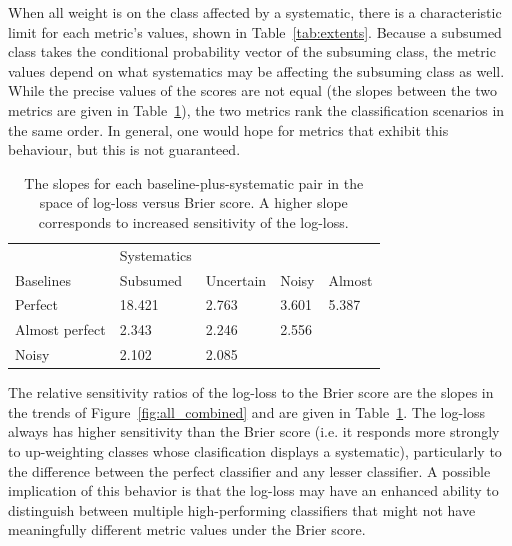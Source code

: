 When all weight is on the class affected by a systematic, there is a characteristic limit for each metric's values, shown in Table~\ref{tab:extents}. Because a subsumed class takes the conditional probability vector of the subsuming class, the metric values depend on what systematics may be affecting the subsuming class as well. While the precise values of the scores are not equal (the slopes between the two metrics are given in Table~\ref{tab:slopes}), the two metrics rank the classification scenarios in the same order. In general, one would hope for metrics that exhibit this behaviour, but this is not guaranteed.




\begin{table}[]
\begin{tabular}{l|llll}
	& Systematics & & &\\
Baselines & Subsumed & Uncertain & Noisy & Almost\\
\hline
Perfect & 18.421 & 2.763 & 3.601 & 5.387\\
Almost perfect & 2.343 & 2.246 & 2.556 & \\
Noisy & 2.102 & 2.085 & &
\end{tabular}
\caption{The slopes for each baseline-plus-systematic pair in the space of log-loss versus Brier score.
A higher slope corresponds to increased sensitivity of the log-loss.}
\label{tab:slopes}
\end{table}

The relative sensitivity ratios of the log-loss to the Brier score are the slopes in the trends of Figure~\ref{fig:all_combined} and are given in Table~\ref{tab:slopes}.
The log-loss always has higher sensitivity than the Brier score (i.e. it responds more strongly to up-weighting classes whose clasification displays a systematic), particularly to the difference between the perfect classifier and any lesser classifier.
A possible implication of this behavior is that the log-loss may have an enhanced ability to distinguish between multiple high-performing classifiers that might not have meaningfully different metric values under the Brier score.

